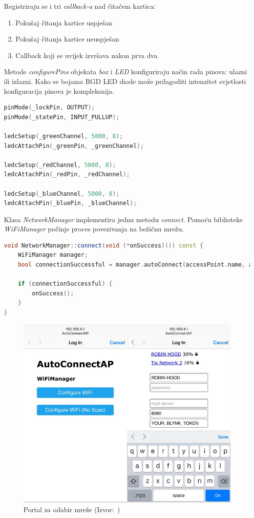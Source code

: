 Registriraju se i tri \textit{callback-a} nad čitačem kartica:
\begin{enumerate}
    \item Pokušaj čitanja kartice uspješan
    \item Pokušaj čitanja kartice neuspješan
    \item Callback koji se uvijek izvršava nakon prva dva
\end{enumerate}

Metode \textit{configurePins} objekata \textit{box} i \textit{LED} konfiguriraju način rada pinova: ulazni ili izlazni.
Kako se bojama RGD LED diode može prilagoditi intenzitet svjetlosti konfiguracija pinova je kompleksnija.

\begin{lstlisting}[language=C++]
pinMode(_lockPin, OUTPUT);
pinMode(_statePin, INPUT_PULLUP);

ledcSetup(_greenChannel, 5000, 8);
ledcAttachPin(_greenPin, _greenChannel);

ledcSetup(_redChannel, 5000, 8);
ledcAttachPin(_redPin, _redChannel);

ledcSetup(_blueChannel, 5000, 8);
ledcAttachPin(_bluePin, _blueChannel);
\end{lstlisting}

Klasa \textit{NetworkManager} implementira jednu metodu \textit{connect}.
Pomoću biblioteke \textit{WiFiManager} počinje proces povezivanja na bežičnu mrežu.

\begin{lstlisting}[language=C++]
void NetworkManager::connect(void (*onSuccess)()) const {
    WiFiManager manager;
    bool connectionSuccessful = manager.autoConnect(accessPoint.name, accessPoint.password);

    if (connectionSuccessful) {
        onSuccess();
    }
}
\end{lstlisting}

\begin{figure}
    \includegraphics[scale=0.3]{images/wifi-access-point}
    \caption{Portal za odabir mreže (Izvor:~\cite{wifi-manager})}
\end{figure}

